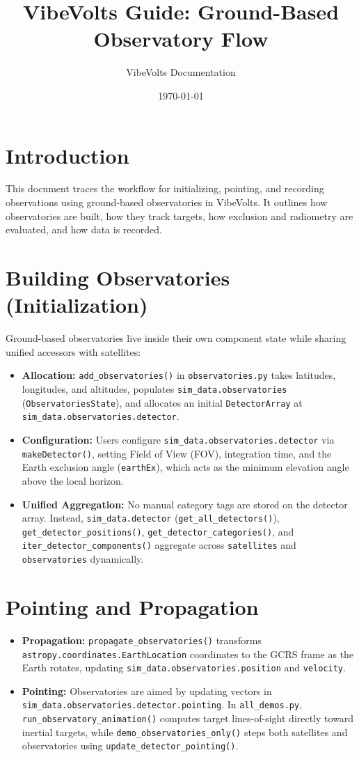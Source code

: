 \documentclass{article}
\title{VibeVolts Guide: Ground-Based Observatory Flow}
\author{VibeVolts Documentation}
\date{\today}
\begin{document}
\maketitle

\section{Introduction}
This document traces the workflow for initializing, pointing, and recording observations using
ground-based observatories in VibeVolts. It outlines how observatories are built, how they track
targets, how exclusion and radiometry are evaluated, and how data is recorded.

\section{Building Observatories (Initialization)}
Ground-based observatories live inside their own component state while sharing unified accessors
with satellites:
\begin{itemize}
    \item \textbf{Allocation:} \texttt{add\_observatories()} in \texttt{observatories.py} takes
    latitudes, longitudes, and altitudes, populates \texttt{sim\_data.observatories}
    (\texttt{ObservatoriesState}), and allocates an initial \texttt{DetectorArray} at
    \texttt{sim\_data.observatories.detector}.
    \item \textbf{Configuration:} Users configure \texttt{sim\_data.observatories.detector} via
    \texttt{makeDetector()}, setting Field of View (FOV), integration time, and the Earth
    exclusion angle (\texttt{earthEx}), which acts as the minimum elevation angle above the local
    horizon.
    \item \textbf{Unified Aggregation:} No manual category tags are stored on the detector array.
    Instead, \texttt{sim\_data.detector} (\texttt{get\_all\_detectors()}),
    \texttt{get\_detector\_positions()}, \texttt{get\_detector\_categories()}, and
    \texttt{iter\_detector\_components()} aggregate across \texttt{satellites} and
    \texttt{observatories} dynamically.
\end{itemize}

\section{Pointing and Propagation}
\begin{itemize}
    \item \textbf{Propagation:} \texttt{propagate\_observatories()} transforms
    \texttt{astropy.coordinates.EarthLocation} coordinates to the GCRS frame as the Earth
    rotates, updating \texttt{sim\_data.observatories.position} and \texttt{velocity}.
    \item \textbf{Pointing:} Observatories are aimed by updating vectors in
    \texttt{sim\_data.observatories.detector.pointing}. In \texttt{all\_demos.py},
    \texttt{run\_observatory\_animation()} computes target lines-of-sight directly toward inertial
    targets, while \texttt{demo\_observatories\_only()} steps both satellites and observatories
    using \texttt{update\_detector\_pointing()}.
\end{itemize}
\end{document}
